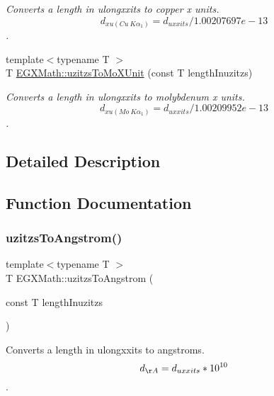 \begin{DoxyCompactItemize}
\begin{DoxyCompactList}\small\item\em Converts a length in ulongxxits to copper x units. \[ d_{xu(Cu\ K\alpha_1)}=d_{uxxits} / 1.00207697e-13 \]. \end{DoxyCompactList}\item 
{\footnotesize template$<$typename T $>$ }\\T \mbox{\hyperlink{group___e_g_x_math-_conversions-_length_conversions-uzitzs-_non-_s_i_ga64b556911b0bb06cf315aa02f5e2d379}{E\+G\+X\+Math\+::uzitzs\+To\+Mo\+X\+Unit}} (const T length\+Inuzitzs)
\begin{DoxyCompactList}\small\item\em Converts a length in ulongxxits to molybdenum x units. \[ d_{xu(Mo\ K\alpha_1)}=d_{uxxits} / 1.00209952e-13 \]. \end{DoxyCompactList}\end{DoxyCompactItemize}


\subsection{Detailed Description}


\subsection{Function Documentation}
\mbox{\label{group___e_g_x_math-_conversions-_length_conversions-uzitzs-_non-_s_i_gaaaecee65b1db5abcc71e18526e7073eb}} 
\subsubsection{\texorpdfstring{uzitzs\+To\+Angstrom()}{uzitzsToAngstrom()}}
{\footnotesize\ttfamily template$<$typename T $>$ \\
T E\+G\+X\+Math\+::uzitzs\+To\+Angstrom (\begin{DoxyParamCaption}\item[{const T}]{length\+Inuzitzs }\end{DoxyParamCaption})}



Converts a length in ulongxxits to angstroms. \[ d_{\AA}=d_{uxxits} * 10^{10} \]. 


